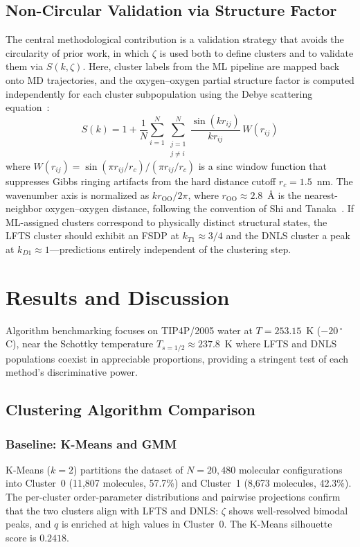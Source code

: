 \documentclass[aps, amsmath,amssymb, reprint, twocolumn,notitlepage,superscriptaddress]{revtex4-2}
\begin{document}
\subsection{Non-Circular Validation via Structure Factor}
\label{sec:structure_factor}
The central methodological contribution is a validation strategy that avoids the circularity of prior work, in which $\zeta$ is used both to define clusters and to validate them via $S(k, \zeta)$. Here, cluster labels from the ML pipeline are mapped back onto MD trajectories, and the oxygen--oxygen partial structure factor is computed independently for each cluster subpopulation using the Debye scattering equation~\cite{debye_zerstreuung_1915}:
\begin{equation}
S(k) = 1 + \frac{1}{N}\sum_{i=1}^{N}\sum_{\substack{j=1 \\ j\neq i}}^{N}\frac{\sin(k r_{ij})}{k r_{ij}}\,W(r_{ij})
\label{eq:debye}
\end{equation}
where $W(r_{ij}) = \sin(\pi r_{ij}/r_c)/(\pi r_{ij}/r_c)$ is a sinc window function that suppresses Gibbs ringing artifacts from the hard distance cutoff $r_c = 1.5$~nm. The wavenumber axis is normalized as $k r_{\text{OO}}/2\pi$, where $r_{\text{OO}} \approx 2.8$~\AA{} is the nearest-neighbor oxygen--oxygen distance, following the convention of Shi and Tanaka~\cite{shi_direct_2020}. If ML-assigned clusters correspond to physically distinct structural states, the LFTS cluster should exhibit an FSDP at $k_{T1} \approx 3/4$ and the DNLS cluster a peak at $k_{D1} \approx 1$---predictions entirely independent of the clustering step.

\section{Results and Discussion}
Algorithm benchmarking focuses on TIP4P/2005 water at $T = 253.15$~K ($-20\,^\circ$C), near the Schottky temperature $T_{s=1/2} \approx 237.8$~K where LFTS and DNLS populations coexist in appreciable proportions, providing a stringent test of each method's discriminative power.

\subsection{Clustering Algorithm Comparison}
\subsubsection{Baseline: K-Means and GMM}
K-Means ($k=2$) partitions the dataset of $N = 20{,}480$ molecular configurations into Cluster~0 (11{,}807 molecules, 57.7\%) and Cluster~1 (8{,}673 molecules, 42.3\%). The per-cluster order-parameter distributions and pairwise projections confirm that the two clusters align with LFTS and DNLS: $\zeta$ shows well-resolved bimodal peaks, and $q$ is enriched at high values in Cluster~0. The K-Means silhouette score is $0.2418$.
\end{document}
